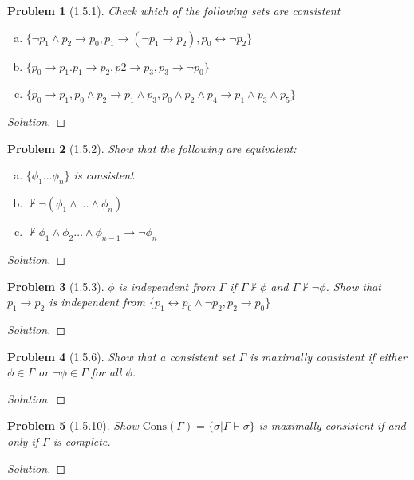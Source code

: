 \documentclass[letter]{article}
\newtheorem{problem}{Problem}
\theoremstyle{definition}
\newenvironment{solution}
{\begin{proof}[Solution]}
	{\end{proof}}
\begin{document}
\begin{problem}[1.5.1] Check which of the following sets are consistent
    \begin{enumerate}[(a)]
        \item $\{\neg p_1 \land p_2 \to p_0, p_1 \to (\neg p_1 \to p_2), p_0 \leftrightarrow \neg p_2\}$
        \item $\{p_0 \to p_1. p_1 \to p_2, p2 \to p_3, p_3 \to \neg p_0\}$
        \item $\{p_0 \to p_1, p_0 \land p_2 \to p_1 \land p_3, p_0 \land p_2 \land p_4 \to p_1 \land p_3 \land p_5 \}$
    \end{enumerate}
\end{problem}
\begin{solution}
\end{solution}

\begin{problem}[1.5.2] Show that the following are equivalent:
    \begin{enumerate}[(a)]
        \item $\{\phi_1 \ldots \phi_n\}$ is consistent
        \item $\not \vdash \neg (\phi_1 \land \ldots \land \phi_n)$
        \item $\not \vdash \phi_1 \land \phi_2 \ldots \land \phi_{n-1}\to \neg \phi_n$
    \end{enumerate}
\end{problem}
\begin{solution}
\end{solution}

\begin{problem}[1.5.3] $\phi$ is \textit{independent} from $\Gamma$ if
    $\Gamma \not \vdash \phi$ and $\Gamma \not \vdash \neg \phi$. Show that $p_1 \to p_2$ is independent from $\{p_1 \leftrightarrow p_0 \land \neg p_2, p_2 \to p_0\}$
\end{problem}
\begin{solution}
\end{solution}

\begin{problem}[1.5.6] Show that a consistent set $\Gamma$ is maximally consistent if either $\phi \in \Gamma$ or $\neg \phi \in \Gamma$ for all $\phi$.
\end{problem}
\begin{solution}
\end{solution}


\begin{problem}[1.5.10] Show $\textrm{Cons}(\Gamma) = \{ \sigma | \Gamma \vdash \sigma \}$ is maximally consistent if and only if $\Gamma$ is complete.
\end{problem}
\begin{solution}
\end{solution}
\end{document}
